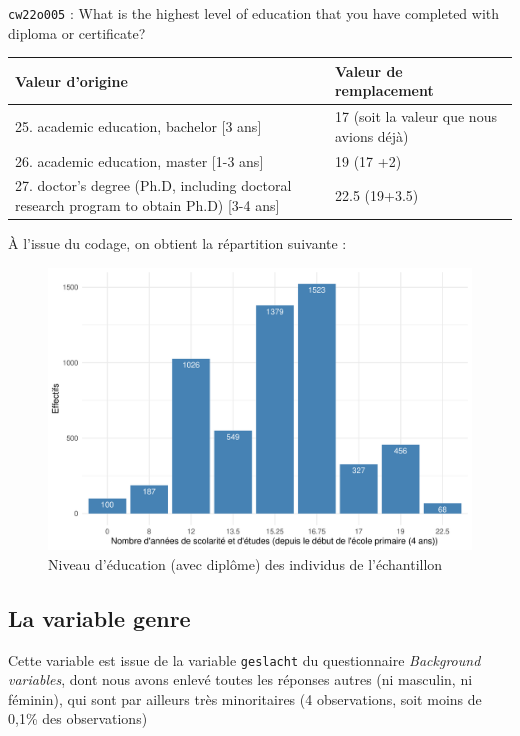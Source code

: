 \documentclass[a4paper, french, 11 pt]{article}\usepackage[]{graphicx}\usepackage[]{xcolor}
\begin{document}
\vspace{0,5cm}
\begin{minipage}{0,8\linewidth}
{\footnotesize\texttt{cw22o005} : What is the highest level of education that you have completed with diploma or certificate?
\vspace{0,2cm}

\begin{tabular}{m{0,5\linewidth}m{0,5\linewidth}}
\hline
Valeur d'origine & Valeur de remplacement \\
\hline
25. academic education, bachelor [3 ans] & 17 (soit la valeur que nous avions déjà) \\
26. academic education, master [1-3 ans] & 19 (17 +2) \\
27. doctor's degree (Ph.D, including doctoral research program to obtain Ph.D) [3-4 ans] & 22.5 (19+3.5) \\
\hline
\end{tabular}}
\end{minipage}
\vspace{0,3cm}

À l'issue du codage, on obtient la répartition suivante : 

\begin{figure}[h]
\center
\includegraphics[width=0.7\linewidth]{figure/educ.pdf}
\caption{Niveau d'éducation (avec diplôme) des individus de l'échantillon}
\end{figure}

\subsection{La variable genre}

Cette variable est issue de la variable \texttt{geslacht} du questionnaire \textit{Background variables}, dont nous avons enlevé toutes les réponses autres (ni masculin, ni féminin), qui sont par ailleurs très minoritaires (4 observations, soit moins de 0,1\% des observations)
\end{document}
